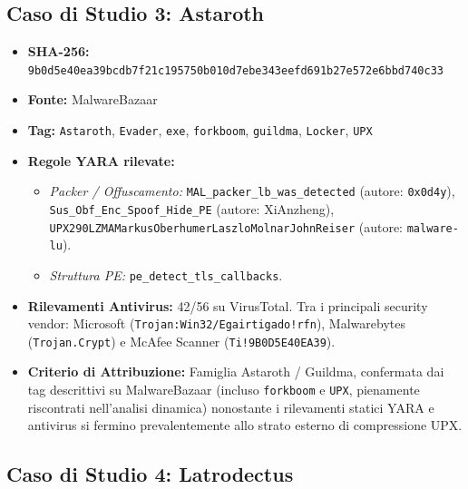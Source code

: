 \documentclass[11pt, a4paper]{article}
\begin{document}
\subsection{Caso di Studio 3: Astaroth}

\begin{itemize}
	\item \textbf{SHA-256:} {\small\texttt{9b0d5e40ea39bcdb7f21c195750b010d7ebe343eefd691b27e572e6bbd740c33}}
	\item \textbf{Fonte:} MalwareBazaar
	\item \textbf{Tag:} \texttt{Astaroth}, \texttt{Evader}, \texttt{exe}, \texttt{forkboom}, \texttt{guildma}, \texttt{Locker}, \texttt{UPX}
	\item \textbf{Regole YARA rilevate:}
	\begin{itemize}
		\item \textit{Packer / Offuscamento:} \texttt{MAL\_\allowbreak{}packer\_\allowbreak{}lb\_\allowbreak{}was\_\allowbreak{}detected} (autore: \texttt{0x0d4y}), \texttt{Sus\_\allowbreak{}Obf\_\allowbreak{}Enc\_\allowbreak{}Spoof\_\allowbreak{}Hide\_\allowbreak{}PE} (autore: XiAnzheng), \texttt{UPX290LZMA\allowbreak{}Markus\allowbreak{}Oberhumer\allowbreak{}Laszlo\allowbreak{}Molnar\allowbreak{}John\allowbreak{}Reiser} (autore: \texttt{malware-lu}).
		\item \textit{Struttura PE:} \texttt{pe\_\allowbreak{}detect\_\allowbreak{}tls\_\allowbreak{}callbacks}.
	\end{itemize}
	\item \textbf{Rilevamenti Antivirus:} 42/56 su VirusTotal. Tra i principali security vendor: Microsoft (\texttt{Trojan:Win32/\allowbreak{}Egairtigado!rfn}), Malwarebytes (\texttt{Trojan.Crypt}) e McAfee Scanner (\texttt{Ti!9B0D5E40EA39}).
	\item \textbf{Criterio di Attribuzione:} Famiglia Astaroth / Guildma, confermata dai tag descrittivi su MalwareBazaar (incluso \texttt{forkboom} e \texttt{UPX}, pienamente riscontrati nell'analisi dinamica) nonostante i rilevamenti statici YARA e antivirus si fermino prevalentemente allo strato esterno di compressione UPX.
\end{itemize}

\subsection{Caso di Studio 4: Latrodectus}
\end{document}
